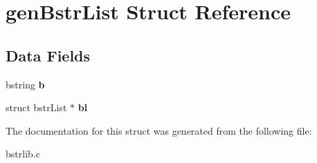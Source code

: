 \hypertarget{structgenBstrList}{}\section{gen\+Bstr\+List Struct Reference}
\label{structgenBstrList}
\subsection*{Data Fields}
\begin{DoxyCompactItemize}
\item 
\hypertarget{structgenBstrList_afbc60fff27346f61f706e48aa9143cb2}{}bstring {\bfseries b}\label{structgenBstrList_afbc60fff27346f61f706e48aa9143cb2}

\item 
\hypertarget{structgenBstrList_abf9382d773a085b9015807e24ac8fbda}{}struct bstr\+List $\ast$ {\bfseries bl}\label{structgenBstrList_abf9382d773a085b9015807e24ac8fbda}

\end{DoxyCompactItemize}


The documentation for this struct was generated from the following file\+:\begin{DoxyCompactItemize}
\item 
bstrlib.\+c\end{DoxyCompactItemize}
